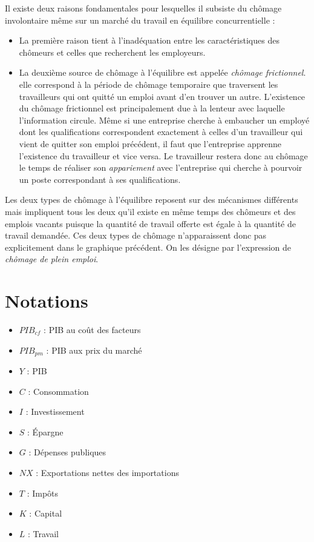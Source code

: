 \documentclass[10pt]{book}
\begin{document}
Il existe deux raisons fondamentales pour lesquelles il subsiste du chômage involontaire même sur un marché du travail en équilibre concurrentielle : 
\begin{itemize}
  \item La première raison tient à l'inadéquation entre les caractéristiques des chômeurs et celles que recherchent les employeurs.
  \item La deuxième source de chômage à l'équilibre est appelée \textit{chômage frictionnel}. elle correspond à la période de chômage temporaire que traversent les travailleurs qui ont quitté un emploi avant d'en trouver un autre. L'existence du chômage frictionnel est principalement due à la lenteur avec laquelle l'information circule. Même si une entreprise cherche à embaucher un employé dont les qualifications correspondent exactement à celles d'un travailleur qui vient de quitter son emploi précédent, il faut que l'entreprise apprenne l'existence du travailleur et vice versa. Le travailleur restera donc au chômage le temps de réaliser son \textit{appariement} avec l'entreprise qui cherche à pourvoir un poste correspondant à ses qualifications.
\end{itemize}
Les deux types de chômage à l'équilibre reposent sur des mécanismes différents mais impliquent tous les deux qu'il existe en même temps des chômeurs et des emplois vacants puisque la quantité de travail offerte est égale à la quantité de travail demandée. Ces deux types de chômage n'apparaissent donc pas explicitement dans le graphique précédent. On les désigne par l'expression de \textit{chômage de plein emploi}.






\appendix
\chapter{Notations} 
\begin{itemize}
  \item $PIB_{cf}$ : PIB au coût des facteurs
  \item $PIB_{pm}$ : PIB aux prix du marché
  \item $Y$ : PIB
  \item $C$ : Consommation
  \item $I$ : Investissement
  \item $S$ : Épargne
  \item $G$ : Dépenses publiques
  \item $NX$ : Exportations nettes des importations
  \item $T$ : Impôts
  \item $K$ : Capital
  \item $L$ : Travail
\end{itemize}
\end{document}
